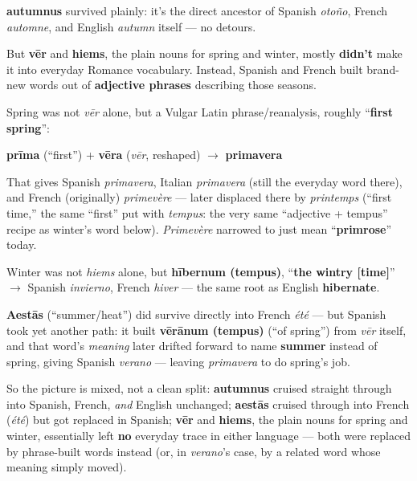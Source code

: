 \begin{culture}
\textbf{autumnus} survived plainly: it's the direct ancestor of Spanish \emph{otoño}, French \emph{automne}, and English \emph{autumn} itself — no detours.

But \textbf{vēr} and \textbf{hiems}, the plain nouns for spring and winter, mostly \textbf{didn't} make it into everyday Romance vocabulary. Instead, Spanish and French built brand-new words out of \textbf{adjective phrases} describing those seasons.

Spring was not \emph{vēr} alone, but a Vulgar Latin phrase/reanalysis, roughly \textquotedblleft{}\textbf{first spring}\textquotedblright{}:

\textbf{prīma} (\textquotedblleft{}first\textquotedblright{}) + \textbf{vēra} (\emph{vēr}, reshaped) $\to$ \textbf{primavera}

That gives Spanish \emph{primavera}, Italian \emph{primavera} (still the everyday word there), and French (originally) \emph{primevère} — later displaced there by \emph{printemps} (\textquotedblleft{}first time,\textquotedblright{} the same \textquotedblleft{}first\textquotedblright{} put with \emph{tempus}: the very same \textquotedblleft{}adjective + tempus\textquotedblright{} recipe as winter's word below). \emph{Primevère} narrowed to just mean \textquotedblleft{}\textbf{primrose}\textquotedblright{} today.

Winter was not \emph{hiems} alone, but \textbf{hībernum (tempus)}, \textquotedblleft{}\textbf{the wintry {[}time{]}}\textquotedblright{} $\to$ Spanish \emph{invierno}, French \emph{hiver} — the same root as English \textbf{hibernate}.

\textbf{Aestās} (\textquotedblleft{}summer/heat\textquotedblright{}) did survive directly into French \emph{été} — but Spanish took yet another path: it built \textbf{vērānum (tempus)} (\textquotedblleft{}of spring\textquotedblright{}) from \emph{vēr} itself, and that word's \emph{meaning} later drifted forward to name \textbf{summer} instead of spring, giving Spanish \emph{verano} — leaving \emph{primavera} to do spring's job.

So the picture is mixed, not a clean split: \textbf{autumnus} cruised straight through into Spanish, French, \emph{and} English unchanged; \textbf{aestās} cruised through into French (\emph{été}) but got replaced in Spanish; \textbf{vēr} and \textbf{hiems}, the plain nouns for spring and winter, essentially left \textbf{no} everyday trace in either language — both were replaced by phrase-built words instead (or, in \emph{verano}'s case, by a related word whose meaning simply moved).
\end{culture}


